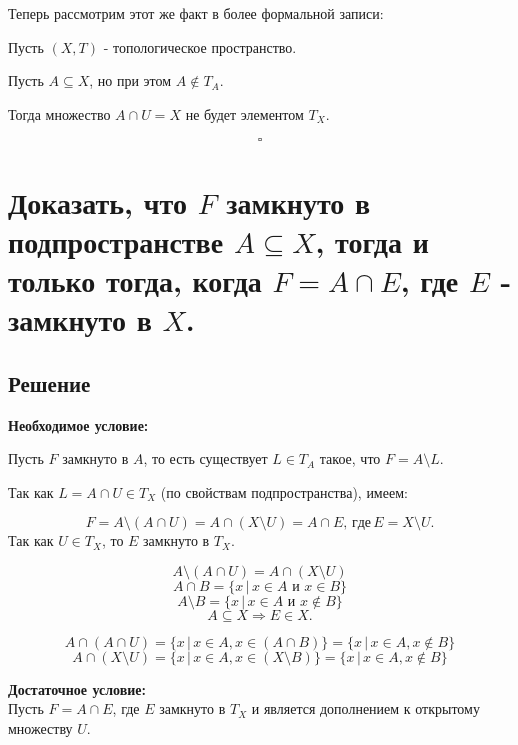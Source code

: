 \documentclass{article}
\begin{document}
        Теперь рассмотрим этот же факт в более формальной записи:
        
        Пусть \( (X, T) \) - топологическое пространство. 
        
        Пусть \( A \subseteq X \), но при этом \( A \notin T_A \).
        
        Тогда множество \( A \cap U = X \) не будет элементом \( T_X \).

        \[
        \square
        \]

        \section*{  Доказать, что \( F \) замкнуто в подпространстве \( A \subseteq X \), тогда и только тогда, когда \( F = A \cap E \), где \( E \) - замкнуто в \( X \).} 

        \subsection*{Решение}

        
        \textbf{Необходимое условие:} 
        
        Пусть \( F \) замкнуто в \( A \), то есть существует \( L \in T_A \) такое, что \( F = A \setminus L \).
        
        Так как \( L = A \cap U \in T_X \) (по свойствам подпространства), имеем:
        
        \[
        F = A \setminus (A \cap U) = A \cap (X \setminus U) = A \cap E, \, где \, E = X \setminus U.
        \]
        Так как \( U \in T_X \), то \( E \) замкнуто в \( T_X \).
        
        \[
        A \setminus (A \cap U) = A \cap (X \setminus U)
        \]
        \[
        A \cap B = \{x \, | \, x \in A \text{ и } x \in B \}
        \]
        \[
        A \setminus B = \{x \, | \, x \in A \text{ и } x \notin B \}
        \]
        \[
        A \subseteq X \Longrightarrow E \in X.
        \]
        
        \[
        A \cap (A \cap U) = \{x \, | \, x \in A, x \in (A \cap B)\} = \{x \, | \, x \in A, x \notin B\}
        \]
        \[
        A \cap (X \setminus U) = \{x \, | \, x \in A, x \in (X \setminus B)\} = \{x \, | \, x \in A, x \notin B\}
        \]
        
        \textbf{Достаточное условие:}\\
        
        Пусть \( F = A \cap E \), где \( E \) замкнуто в \( T_X \) и является дополнением к открытому множеству \( U \).
        
\end{document}

